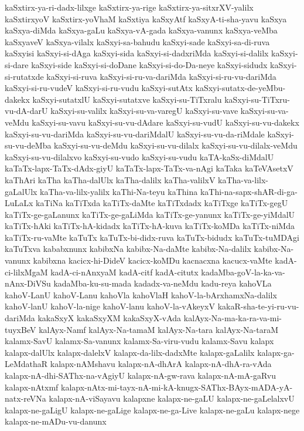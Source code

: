 {kaSxtirx-ya-ri-dadx-lilxge
kaSxtirx-ya-rige
kaSxtirx-ya-sitxrXV-yalilx
kaSxtirxyoV
kaSxtirx-yoVhaM
kaSxtiya
kaSxyAtf
kaSxyA-ti-sha-yavu
kaSxya
kaSxya-diMda
kaSxya-gaLu
kaSxya-vA-gada
kaSxya-vanunx
kaSxya-veMba
kaSxyaveV
kaSxya-vilalx
kaSxyi-sa-bahudu
kaSxyi-sade
kaSxyi-sa-di-ruva
kaSxyisi
kaSxyi-si-dAga
kaSxyi-sida
kaSxyi-si-dadxriMda
kaSxyi-si-dalilx
kaSxyi-si-dare
kaSxyi-side
kaSxyi-si-doDane
kaSxyi-si-do-Da-neye
kaSxyi-sidudx
kaSxyi-si-rutatxde
kaSxyi-si-ruva
kaSxyi-si-ru-va-dariMda
kaSxyi-si-ru-vu-dariMda
kaSxyi-si-ru-vudeV
kaSxyi-si-ru-vudu
kaSxyi-sutAtx
kaSxyi-sutatx-de-yeMbu-dakekx
kaSxyi-sutatxlU
kaSxyi-sutatxve
kaSxyi-su-TiTxralu
kaSxyi-su-TiTxru-vu-dA-darU
kaSxyi-su-valilx
kaSxyi-su-va-varegU
kaSxyi-su-vave
kaSxyi-su-va-veMdu
kaSxyi-su-vavu
kaSxyi-su-vu-dAdare
kaSxyi-su-vudU
kaSxyi-su-vu-dakekx
kaSxyi-su-vu-dariMda
kaSxyi-su-vu-dariMdalU
kaSxyi-su-vu-da-riMdale
kaSxyi-su-vu-deMba
kaSxyi-su-vu-deMdu
kaSxyi-su-vu-dilalx
kaSxyi-su-vu-dilalx-veMdu
kaSxyi-su-vu-dilalxvo
kaSxyi-su-vudo
kaSxyi-su-vudu
kaTA-kaSx-diMdalU
kaTaTx-lapx-TaTx-dAdx-giyU
kaTaTx-lapx-TaTx-va-nAgi
kaTaka
kaTeVAsetxV
kaThAri
kaTha
kaTha-dalUlx
kaTha-dalilx
kaTha-valilxV
kaTha-va-lilx-gaLalUlx
kaTha-va-lilx-yalilx
kaThi-Na-teyu
kaThina
kaThi-na-sapx-shAR-di-ga-LuLaLx
kaTiNa
kaTiTxda
kaTiTx-daMte
kaTiTxdadx
kaTiTxge
kaTiTx-gegU
kaTiTx-ge-gaLanunx
kaTiTx-ge-gaLiMda
kaTiTx-ge-yanunx
kaTiTx-ge-yiMdalU
kaTiTx-hAki
kaTiTx-hA-kidadx
kaTiTx-hA-kuva
kaTiTx-koMDa
kaTiTx-niMda
kaTiTx-ru-vaMte
kaTuTx
kaTuTx-bi-didx-ruva
kaTuTx-bidudx
kaTuTx-tuMDAgi
kaTuTxva
kababxnunx
kabibxNa
kabibx-Na-daMte
kabibx-Na-dalilx
kabibx-Na-vanunx
kabibxna
kacicx-hi-DideV
kacicx-koMDu
kacnacxna
kacucx-vaMte
kadA-ci-lilxMgaM
kadA-ci-nAnxyaM
kadA-citf
kadA-citutx
kadaMba-goV-la-ka-va-nAnx-DiVSu
kadaMba-ku-su-mada
kadadx-va-neMdu
kadu-reya
kahoVLa
kahoV-LanU
kahoV-Lanu
kahoVla
kahoVlaH
kahoV-la-bArxhamxNa-dalilx
kahoV-lanU
kahoV-la-nige
kahoV-lanu
kahoV-la-vAkeyxV
kakaR-sha-te-yi-ru-vu-dariMda
kakaSxyX
kakaSxyXM
kakaSxyX-vAda
kalAyx-Na-ma-ka-ra-va-mi-tuyxBeV
kalAyx-Namf
kalAyx-Na-tamaM
kalAyx-Na-tara
kalAyx-Na-taraM
kalamx-SavU
kalamx-Sa-vanunx
kalamx-Sa-viru-vudu
kalamx-Savu
kalapx
kalapx-dalUlx
kalapx-dalelxV
kalapx-da-lilx-dadxMte
kalapx-gaLalilx
kalapx-ga-LeMdathaR
kalapx-nAMshavu
kalapx-nA-dhArA
kalapx-nA-dhA-ra-vAda
kalapx-nA-dhi-SAThx-na-vAgiyU
kalapx-nA-gw-rava
kalapx-nA-mA-gaRvu
kalapx-nAtxmf
kalapx-nAtx-mi-tayx-nA-mi-kA-knugx-SAThx-BAyx-mADA-yA-natx-reVNa
kalapx-nA-viSayavu
kalapxne
kalapx-ne-gaLU
kalapx-ne-gaLelalxvU
kalapx-ne-gaLigU
kalapx-ne-gaLige
kalapx-ne-ga-Live
kalapx-ne-gaLu
kalapx-nege
kalapx-ne-mADu-vu-danunx
}
